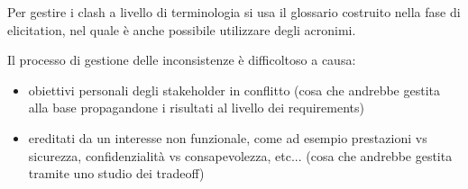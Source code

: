 Per gestire i clash a livello di terminologia si usa il glossario costruito nella
fase di elicitation, nel quale è anche possibile utilizzare degli acronimi.

Il processo di gestione delle inconsistenze è difficoltoso a causa:
\begin{itemize}
      \item obiettivi personali degli stakeholder in conflitto (cosa che
            andrebbe gestita alla base propagandone i risultati al livello dei requirements)
      \item ereditati da un interesse non funzionale, come ad esempio prestazioni vs
            sicurezza, confidenzialità vs consapevolezza, etc... (cosa che andrebbe
            gestita tramite uno studio dei tradeoff)
\end{itemize}

